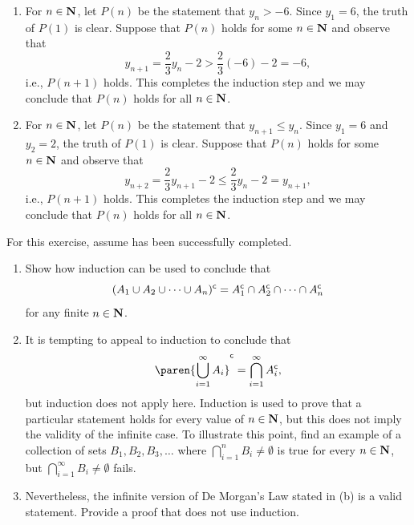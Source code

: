 \documentclass{lew98_solutions}
\begin{document}
\begin{solution}
    \begin{enumerate}
        \item For \( n \in \mathbf{N} \), let \( P(n) \) be the statement that \( y_n > -6 \). Since \( y_1 = 6 \), the truth of \( P(1) \) is clear. Suppose that \( P(n) \) holds for some \( n \in \mathbf{N} \) and observe that
        \[
            y_{n+1} = \frac{2}{3} y_n - 2 > \frac{2}{3} (-6) - 2 = -6,
        \]
        i.e., \( P(n + 1) \) holds. This completes the induction step and we may conclude that \( P(n) \) holds for all \( n \in \mathbf{N} \).

        \item For \( n \in \mathbf{N} \), let \( P(n) \) be the statement that \( y_{n+1} \leq y_n \). Since \( y_1 = 6 \) and \( y_2 = 2 \), the truth of \( P(1) \) is clear. Suppose that \( P(n) \) holds for some \( n \in \mathbf{N} \) and observe that
        \[
            y_{n+2} = \frac{2}{3} y_{n+1} - 2 \leq \frac{2}{3} y_n - 2 = y_{n+1},
        \]
        i.e., \( P(n + 1) \) holds. This completes the induction step and we may conclude that \( P(n) \) holds for all \( n \in \mathbf{N} \).
    \end{enumerate}
\end{solution}

\begin{exercise}
\label{ex:1.2.13}
    For this exercise, assume  has been successfully completed.
    \begin{enumerate}
        \item Show how induction can be used to conclude that
        \[
            (A_1 \cup A_2 \cup \cdots \cup A_n)^{\mathsf{c}} = A_1^{\mathsf{c}} \cap A_2^{\mathsf{c}} \cap \cdots \cap A_n^{\mathsf{c}}
        \]
        for any finite \( n \in \mathbf{N} \).

        \item It is tempting to appeal to induction to conclude that
        \[
            \setcomp{\paren{ \bigcup_{i=1}^{\infty} A_i }} = \bigcap_{i=1}^{\infty} \setcomp{A_i},
        \]
        but induction does not apply here. Induction is used to prove that a particular statement holds for every value of \( n \in \mathbf{N} \), but this does not imply the validity of the infinite case. To illustrate this point, find an example of a collection of sets \( B_1, B_2, B_3, \ldots \) where \( \bigcap_{i=1}^n B_i \neq \emptyset \) is true for every \( n \in \mathbf{N} \), but \( \bigcap_{i=1}^{\infty} B_i \neq \emptyset \) fails.

        \item Nevertheless, the infinite version of De Morgan's Law stated in (b) is a valid statement. Provide a proof that does not use induction.
    \end{enumerate}
\end{exercise}
\end{document}
